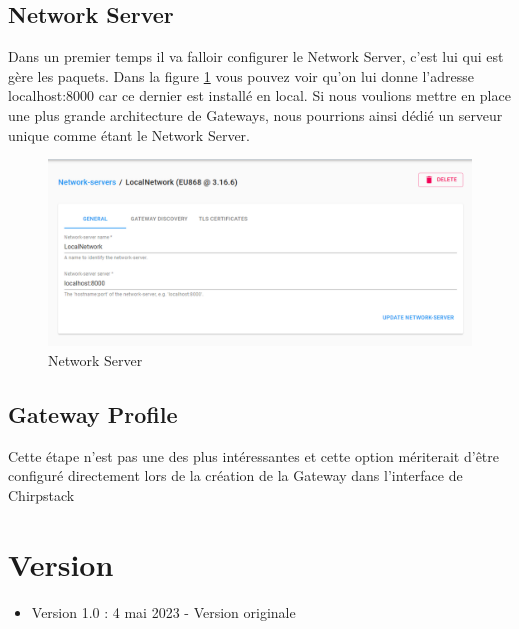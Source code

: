 \documentclass{article}
\begin{document}
		\subsection{Network Server}
			Dans un premier temps il va falloir configurer le Network Server, c'est lui qui est gère les paquets. Dans la figure \ref{fig:networkserver} vous pouvez voir qu'on lui donne l'adresse localhost:8000 car ce dernier est installé en local. Si nous voulions mettre en place une plus grande architecture de Gateways, nous pourrions ainsi dédié un serveur unique comme étant le Network Server.
			\begin{figure}[H]
				\centering
				\includegraphics[width=0.7\linewidth]{networkserver}
				\caption{Network Server}
				\label{fig:networkserver}
			\end{figure}
		
		\subsection{Gateway Profile}
			Cette étape n'est pas une des plus intéressantes et cette option mériterait d'être configuré directement lors de la création de la Gateway dans l'interface de Chirpstack
		
	\newpage
	\section{Version}
		\begin{itemize}
			\item Version 1.0 : 4 mai 2023 - Version originale
		\end{itemize}
\end{document}
